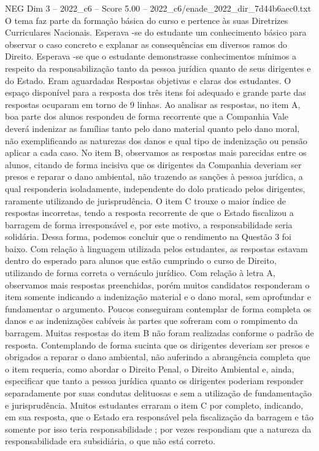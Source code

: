 \begin{textsample}{NEG Dim 3 – 2022\_c6 – Score 5.00 – 2022\_c6/enade\_2022\_dir\_7d44b6aec0.txt}
O tema faz parte da formação básica do curso e pertence às suas Diretrizes Curriculares Nacionais.
Esperava -se do estudante um conhecimento básico para observar o caso concreto e explanar as consequências em diversos ramos do Direito.
Esperava -se que o estudante demonstrasse conhecimentos mínimos a respeito da responsabilização tanto da pessoa jurídica quanto de seus dirigentes e do Estado.
Eram aguardadas Respostas objetivas e claras dos estudantes.
O espaço disponível para a resposta dos três itens foi adequado e grande parte das respostas ocuparam em torno de 9 linhas.
Ao analisar as respostas, no item A, boa parte dos alunos respondeu de forma recorrente que a Companhia Vale deverá indenizar as famílias tanto pelo dano material quanto pelo dano moral, não exemplificando as naturezas dos danos e qual tipo de indenização ou pensão aplicar a cada caso.
No item B, observamos as respostas mais parecidas entre os alunos, citando de forma incisiva que os dirigentes da Companhia deveriam ser presos e reparar o dano ambiental, não trazendo as sanções à pessoa jurídica, a qual responderia isoladamente, independente do dolo praticado pelos dirigentes, raramente utilizando de jurisprudência.
O item C trouxe o maior índice de respostas incorretas, tendo a resposta recorrente de que o Estado fiscalizou a barragem de forma irresponsável e, por este motivo, a responsabilidade seria solidária.
Dessa forma, podemos concluir que o rendimento na Questão 3 foi baixo.
Com relação à linguagem utilizada pelos estudantes, as respostas estavam dentro do esperado para alunos que estão cumprindo o curso de Direito, utilizando de forma correta o vernáculo jurídico.
Com relação à letra A, observamos mais respostas preenchidas, porém muitos candidatos responderam o item somente indicando a indenização material e o dano moral, sem aprofundar e fundamentar o argumento.
Poucos conseguiram contemplar de forma completa os danos e as indenizações cabíveis às partes que sofreram com o rompimento da barragem.
Muitas respostas do item B não foram realizadas conforme o padrão de resposta.
Contemplando de forma sucinta que os dirigentes deveriam ser presos e obrigados a reparar o dano ambiental, não auferindo a abrangência completa que o item requeria, como abordar o Direito Penal, o Direito Ambiental e, ainda, especificar que tanto a pessoa jurídica quanto os dirigentes poderiam responder separadamente por suas condutas delituosas e sem a utilização de fundamentação e jurisprudência.
Muitos estudantes erraram o item C por completo, indicando, em sua resposta, que o Estado era responsável pela fiscalização da barragem e tão somente por isso teria responsabilidade ; por vezes respondiam que a natureza da responsabilidade era subsidiária, o que não está correto.

\end{textsample}
